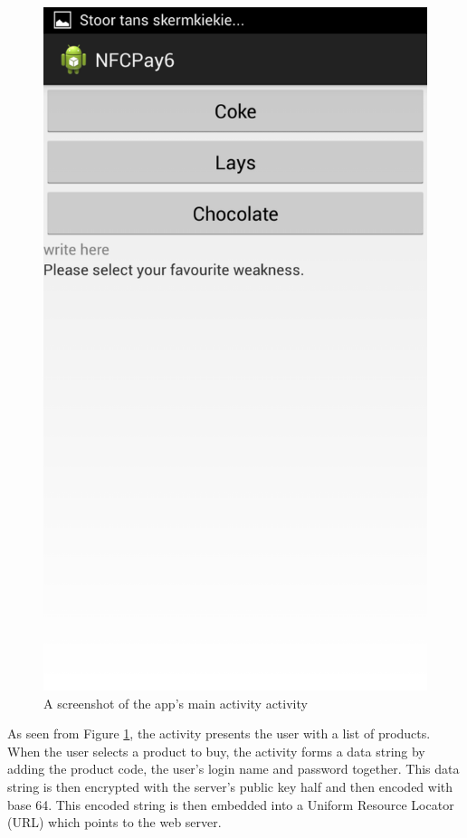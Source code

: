 \begin{figure}
 \centering 
 \includegraphics[clip = true, trim = 0 520 0 60,
 scale=0.2]{main_menu}
 \caption{A screenshot of the app's main activity activity}
 \label{fig:main-activity-screenshot}
\end{figure}

As seen from Figure \ref{fig:main-activity-screenshot}, the activity presents
the user with a list of products. When the user selects a product to buy, the
activity forms a data string by adding the product code, the user's login
name and password together. This data string is then encrypted with the
server's public key half and then encoded with base 64. This encoded string
is then embedded into a Uniform Resource Locator (URL) which points to the
web server. 

